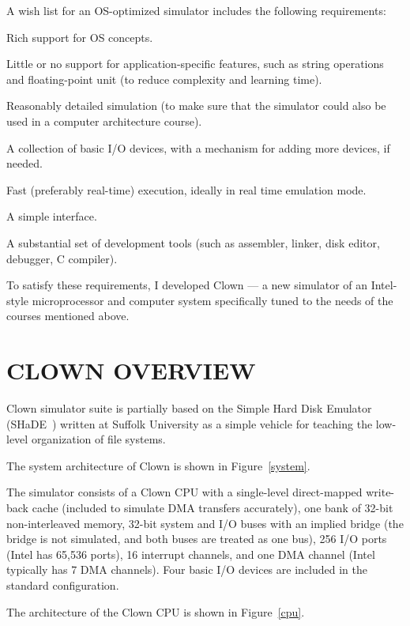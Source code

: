 \documentclass[10pt,twoside]{article}
\newenvironment{mylist}{\begin{list}{}{\setlength\itemsep{0\baselineskip}}}{\end{list}}
\begin{document}
A wish list for an OS-optimized simulator includes the following
requirements:

\begin{mylist}
\item Rich support for OS concepts.
\item Little or no support for application-specific features, such as
  string operations and floating-point unit (to reduce complexity and
  learning time).
\item Reasonably detailed simulation (to make sure that the simulator
  could also be used in a computer architecture course). 
\item A collection of basic I/O devices, with a mechanism for adding
  more devices, if needed.
\item Fast (preferably real-time) execution, ideally in real time
  emulation mode.
\item A simple interface.
\item A substantial set of development tools (such as assembler,
  linker, disk editor, debugger, C compiler).
\end{mylist}

To satisfy these requirements, I developed Clown --- a new simulator
of an Intel-style microprocessor and computer system specifically
tuned to the needs of the courses mentioned above.

\section{CLOWN OVERVIEW}

Clown simulator suite is partially based on the Simple Hard Disk
Emulator (SHaDE~\cite{shade02}) written at Suffolk University as a
simple vehicle for teaching the low-level organization of file
systems.

The system architecture of Clown is shown in Figure~\ref{system}.

The simulator consists of a Clown CPU with a single-level
direct-mapped write-back cache (included to simulate DMA transfers
accurately), one bank of 32-bit non-interleaved memory, 32-bit system
and I/O buses with an implied bridge (the bridge is not simulated, and
both buses are treated as one bus), 256 I/O ports (Intel has 65,536
ports), 16 interrupt channels, and one DMA channel (Intel typically has
7 DMA channels). Four basic I/O devices are included in the standard
configuration. 

The architecture of the Clown CPU is shown in Figure~\ref{cpu}.
\end{document}

